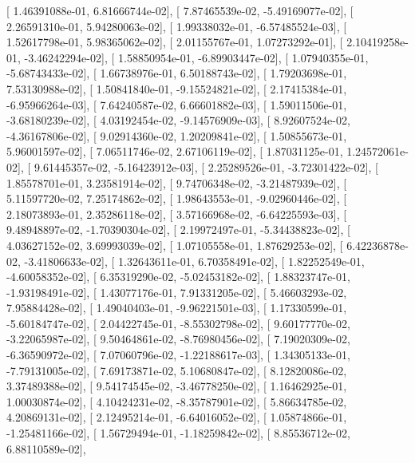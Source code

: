 \documentclass{article}
\begin{document}
       [  1.46391088e-01,   6.81666744e-02],
       [  7.87465539e-02,  -5.49169077e-02],
       [  2.26591310e-01,   5.94280063e-02],
       [  1.99338032e-01,  -6.57485524e-03],
       [  1.52617798e-01,   5.98365062e-02],
       [  2.01155767e-01,   1.07273292e-01],
       [  2.10419258e-01,  -3.46242294e-02],
       [  1.58850954e-01,  -6.89903447e-02],
       [  1.07940355e-01,  -5.68743433e-02],
       [  1.66738976e-01,   6.50188743e-02],
       [  1.79203698e-01,   7.53130988e-02],
       [  1.50841840e-01,  -9.15524821e-02],
       [  2.17415384e-01,  -6.95966264e-03],
       [  7.64240587e-02,   6.66601882e-03],
       [  1.59011506e-01,  -3.68180239e-02],
       [  4.03192454e-02,  -9.14576909e-03],
       [  8.92607524e-02,  -4.36167806e-02],
       [  9.02914360e-02,   1.20209841e-02],
       [  1.50855673e-01,   5.96001597e-02],
       [  7.06511746e-02,   2.67106119e-02],
       [  1.87031125e-01,   1.24572061e-02],
       [  9.61445357e-02,  -5.16423912e-03],
       [  2.25289526e-01,  -3.72301422e-02],
       [  1.85578701e-01,   3.23581914e-02],
       [  9.74706348e-02,  -3.21487939e-02],
       [  5.11597720e-02,   7.25174862e-02],
       [  1.98643553e-01,  -9.02960446e-02],
       [  2.18073893e-01,   2.35286118e-02],
       [  3.57166968e-02,  -6.64225593e-03],
       [  9.48948897e-02,  -1.70390304e-02],
       [  2.19972497e-01,  -5.34438823e-02],
       [  4.03627152e-02,   3.69993039e-02],
       [  1.07105558e-01,   1.87629253e-02],
       [  6.42236878e-02,  -3.41806633e-02],
       [  1.32643611e-01,   6.70358491e-02],
       [  1.82252549e-01,  -4.60058352e-02],
       [  6.35319290e-02,  -5.02453182e-02],
       [  1.88323747e-01,  -1.93198491e-02],
       [  1.43077176e-01,   7.91331205e-02],
       [  5.46603293e-02,   7.95884428e-02],
       [  1.49040403e-01,  -9.96221501e-03],
       [  1.17330599e-01,  -5.60184747e-02],
       [  2.04422745e-01,  -8.55302798e-02],
       [  9.60177770e-02,  -3.22065987e-02],
       [  9.50464861e-02,  -8.76980456e-02],
       [  7.19020309e-02,  -6.36590972e-02],
       [  7.07060796e-02,  -1.22188617e-03],
       [  1.34305133e-01,  -7.79131005e-02],
       [  7.69173871e-02,   5.10680847e-02],
       [  8.12820086e-02,   3.37489388e-02],
       [  9.54174545e-02,  -3.46778250e-02],
       [  1.16462925e-01,   1.00030874e-02],
       [  4.10424231e-02,  -8.35787901e-02],
       [  5.86634785e-02,   4.20869131e-02],
       [  2.12495214e-01,  -6.64016052e-02],
       [  1.05874866e-01,  -1.25481166e-02],
       [  1.56729494e-01,  -1.18259842e-02],
       [  8.85536712e-02,   6.88110589e-02],
\end{document}
